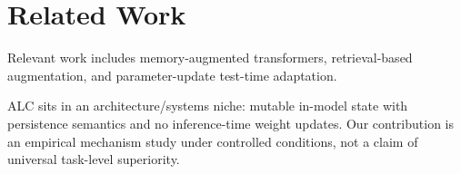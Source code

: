 \section{Related Work}
Relevant work includes memory-augmented transformers, retrieval-based augmentation, and parameter-update test-time adaptation.

ALC sits in an architecture/systems niche: mutable in-model state with persistence semantics and no inference-time weight updates. Our contribution is an empirical mechanism study under controlled conditions, not a claim of universal task-level superiority.
